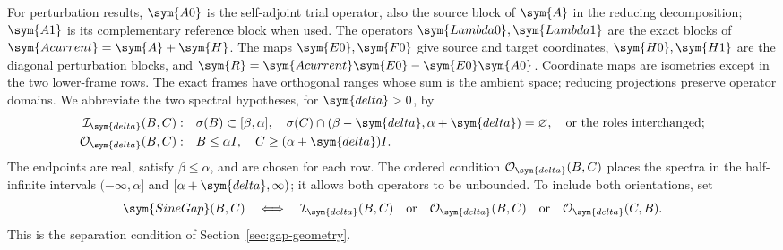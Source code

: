 For perturbation results, $\sym{A0}$ is the self-adjoint trial operator,
also the source block of $\sym{A}$ in the reducing decomposition;
$\sym{A1}$ is its complementary reference block when used.
The operators $\sym{Lambda0},\sym{Lambda1}$ are the exact blocks of
$\sym{Acurrent}=\sym{A}+\sym{H}$.
The maps $\sym{E0},\sym{F0}$ give source and target coordinates,
$\sym{H0},\sym{H1}$ are the diagonal perturbation blocks, and
$\sym{R}=\sym{Acurrent}\sym{E0}-\sym{E0}\sym{A0}$.
Coordinate maps are isometries except in the two lower-frame rows.
The exact frames have orthogonal ranges whose sum is the ambient space;
reducing projections preserve operator domains.
We abbreviate the two spectral hypotheses, for $\sym{delta}>0$, by
\begin{align*}
 \mathcal I_{\sym{delta}}(B,C):\quad&
 \sigma(B)\subset[\beta,\alpha],\quad
 \sigma(C)\cap(\beta-\sym{delta},\alpha+\sym{delta})=\varnothing,
 \quad\text{or the roles interchanged};\\
 \mathcal O_{\sym{delta}}(B,C):\quad&
 B\le\alpha I,\quad C\ge(\alpha+\sym{delta})I.
\end{align*}
The endpoints are real, satisfy $\beta\le\alpha$, and are chosen for each row.
The ordered condition $\mathcal O_{\sym{delta}}(B,C)$ places the spectra in
the half-infinite intervals $(-\infty,\alpha]$ and
$[\alpha+\sym{delta},\infty)$; it allows both operators to be unbounded.
To include both orientations, set
\[
 \sym{SineGap}(B,C)\quad\Longleftrightarrow\quad
 \mathcal I_{\sym{delta}}(B,C)\quad\text{or}\quad
 \mathcal O_{\sym{delta}}(B,C)\quad\text{or}\quad
 \mathcal O_{\sym{delta}}(C,B).
\]
This is the separation condition of Section~\ref{sec:gap-geometry}.

